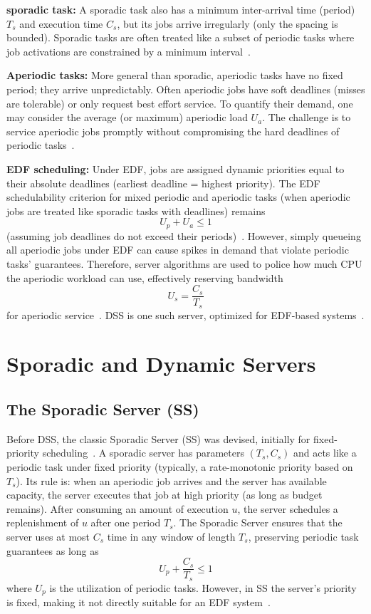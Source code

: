 \documentclass[conference]{IEEEtran}
\begin{document}
\textbf{sporadic task:} A sporadic task also has a minimum inter-arrival time (period) $T_s$ and execution time $C_s$, but its jobs arrive irregularly (only the spacing is bounded). Sporadic tasks are often treated like a subset of periodic tasks where job activations are constrained by a minimum interval~\cite{buttazzo2011hard}.

\textbf{Aperiodic tasks:} More general than sporadic, aperiodic tasks have no fixed period; they arrive unpredictably. Often aperiodic jobs have soft deadlines (misses are tolerable) or only request best effort service. To quantify their demand, one may consider the average (or maximum) aperiodic load $U_a$. The challenge is to service aperiodic jobs promptly without compromising the hard deadlines of periodic tasks~\cite{buttazzo2011hard}.

\textbf{EDF scheduling:} Under EDF, jobs are assigned dynamic priorities equal to their absolute deadlines (earliest deadline = highest priority). The EDF schedulability criterion for mixed periodic and aperiodic tasks (when aperiodic jobs are treated like sporadic tasks with deadlines) remains
\[
U_p + U_a \leq 1
\]
(assuming job deadlines do not exceed their periods)~\cite{spuri1994efficient}. However, simply queueing all aperiodic jobs under EDF can cause spikes in demand that violate periodic tasks' guarantees. Therefore, server algorithms are used to police how much CPU the aperiodic workload can use, effectively reserving bandwidth
\[
U_s = \frac{C_s}{T_s}
\]
for aperiodic service~\cite{buttazzo2011hard}. DSS is one such server, optimized for EDF-based systems~\cite{buttazzo2011hard}.

\section{Sporadic and Dynamic Servers}

\subsection{The Sporadic Server (SS)}
Before DSS, the classic Sporadic Server (SS) was devised, initially for fixed-priority scheduling~\cite{buttazzo2011hard}. 
A sporadic server has parameters $(T_s, C_s)$ and acts like a periodic task under fixed priority (typically, a rate-monotonic priority based on $T_s$). 
Its rule is: when an aperiodic job arrives and the server has available capacity, the server executes that job at high priority (as long as budget remains). 
After consuming an amount of execution $u$, the server schedules a replenishment of $u$ after one period $T_s$. 
The Sporadic Server ensures that the server uses at most $C_s$ time in any window of length $T_s$, preserving periodic task guarantees as long as
\[
U_p + \frac{C_s}{T_s} \leq 1
\]
where $U_p$ is the utilization of periodic tasks. However, in SS the server’s priority is fixed, making it not directly suitable for an EDF system~\cite{buttazzo2011hard}.
\end{document}
